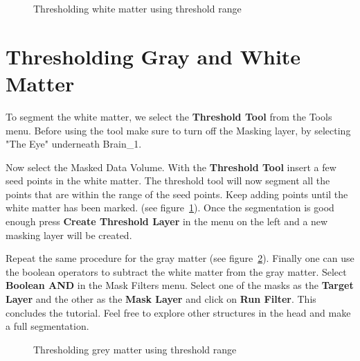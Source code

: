 \documentclass[fleqn,11pt,openany]{book}
\begin{document}
\begin{figure}
\caption{Thresholding white matter using threshold range}\label{fig:ThresholdWhiteMatter}
\end{figure}

\section{Thresholding Gray and White Matter}

To segment the white matter, we select the {\bf Threshold Tool} from the Tools menu. Before using the tool make sure to turn off the Masking layer, by selecting  "The Eye" underneath Brain\_1. 

Now select the Masked Data Volume. With the {\bf Threshold Tool} insert a few seed points in the white matter. The threshold tool will now segment all the points that are within the range of the seed points. Keep adding points until the white matter has been marked.
(see figure~\ref{fig:ThresholdWhiteMatter}). Once the segmentation is good enough press {\bf Create Threshold Layer} in the menu on the left and a new masking layer will be created.

Repeat the same procedure for the gray matter (see figure~\ref{fig:ThresholdGrayMatter}). Finally one can use the boolean operators to subtract the white matter from the gray matter. Select {\bf Boolean AND} in the Mask Filters menu. Select one of the masks as the {\bf Target Layer} and the other as the {\bf Mask Layer} and click on {\bf Run Filter}. This concludes the tutorial. Feel free to explore other structures in the head and make a full segmentation.

\begin{figure}
\caption{Thresholding grey matter using threshold range}\label{fig:ThresholdGrayMatter}
\end{figure}
\end{document}

